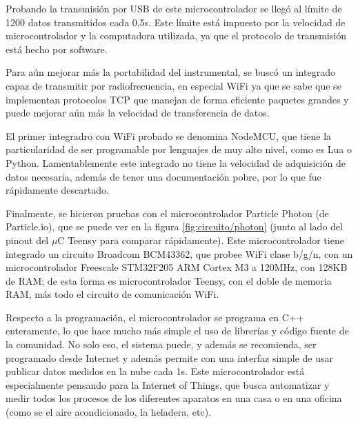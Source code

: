 Probando la transmisión por USB de este microcontrolador se llegó al límite de 1200 datos transmitidos cada 0,5s. Este límite está impuesto por la velocidad de microcontrolador y la computadora utilizada, ya que el protocolo de transmisión está hecho por software.

Para aún mejorar más la portabilidad del instrumental, se buscó un integrado capaz de transmitir por radiofrecuencia, en especial WiFi ya que se sabe que se implementan protocolos TCP que manejan de forma eficiente paquetes grandes y puede mejorar aún más la velocidad de transferencia de datos.

El primer integradro con WiFi probado se denomina NodeMCU, que tiene la particularidad de ser programable por lenguajes de muy alto nivel, como es Lua o Python. Lamentablemente este integrado no tiene la velocidad de adquisición de datos necesaria, además de tener una documentación pobre, por lo que fue rápidamente descartado.

Finalmente, se hicieron pruebas con el microcontrolador Particle Photon\cite{particle_photon} (de Particle.io), que se puede ver en la figura \ref{fig:circuito/photon} (junto al lado del pinout del $\mu$C Teensy para comparar rápidamente). Este microcontrolador tiene integrado un circuito Broadcom BCM43362, que probee WiFi clase b/g/n, con un microcontrolador Freescale STM32F205 ARM Cortex M3 a 120MHz, con 128KB de RAM; de esta forma es microcontrolador Teensy, con el doble de memoria RAM, más todo el circuito de comunicación WiFi. 

 Respecto a la programación, el microcontrolador se programa en C++ enteramente, lo que hace mucho más simple el uso de librerías y código fuente de la comunidad. No solo eso, el sistema puede, y además se recomienda, ser programado desde Internet y además permite con una interfaz simple de usar publicar datos medidos en la nube cada 1s. Este microcontrolador está especialmente pensando para la Internet of Things, que busca automatizar y medir todos los procesos de los diferentes aparatos en una casa o en una oficina (como se el aire acondicionado, la heladera, etc).

